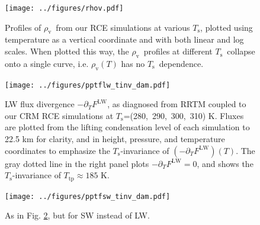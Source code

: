 \documentclass[10pt]{article}
\newcommand{\ppt}{\ensuremath{\partial_T}}
\newcommand{\FLW}{\ensuremath{F^\mathrm{LW}}}
\newcommand{\rhov}{\ensuremath{\rho_\mathrm{v}}}
\newcommand{\Ts}{\ensuremath{T_\mathrm{s}}}
\newcommand{\Ttp}{\ensuremath{T_\mathrm{tp}}}
\begin{document}
\pagebreak

\begin{figure}[h]
	\begin{center}
			\texttt{[image: ../figures/rhov.pdf]}
		\caption{Profiles of \rhov\ from our RCE simulations at various \Ts, plotted using temperature as a vertical coordinate and with both linear and log scales. When plotted this way, the \rhov\ profiles at different \Ts\ collapse onto a single curve, i.e. $\rhov(T)$ has no \Ts\ dependence. 
		\label{rhov_fig}
		}
	\end{center}
\end{figure}



\begin{figure}[h]
	\begin{center}
			\texttt{[image: ../figures/pptflw\_tinv\_dam.pdf]}
		\caption{LW flux divergence  $-\ppt \FLW$, as diagnosed from RRTM coupled to our CRM RCE simulations at \Ts=(280,\ 290,\ 300,\ 310) K. Fluxes are plotted from the lifting condensation level of each simulation to 22.5 km for clarity, and  in height, pressure, and temperature coordinates to emphasize the \Ts-invariance of  $(-\ppt \FLW)(T)$. The gray dotted line in the right panel plots $-\ppt \FLW = 0$, and shows the \Ts-invariance of $\Ttp \approx 185$ K.
		\label{pptflw_tinv_dam}
		}
	\end{center}
\end{figure}

\begin{figure}[h]
	\begin{center}
			\texttt{[image: ../figures/pptfsw\_tinv\_dam.pdf]}
		\caption{As in Fig. \ref{pptflw_tinv_dam}, but for SW instead of LW.
		\label{pptfsw_tinv_dam}
		}
	\end{center}
\end{figure}
\end{document}
